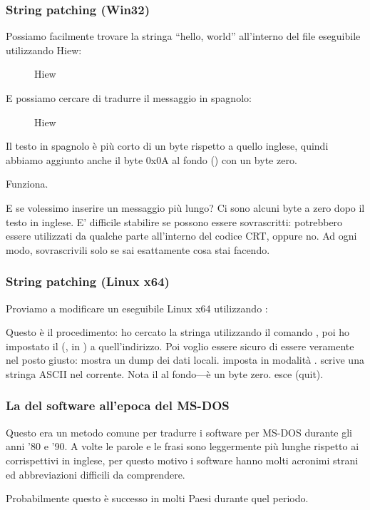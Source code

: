 \subsubsection{String patching (Win32)}

Possiamo facilmente trovare la stringa ``hello, world'' all'interno del file eseguibile utilizzando Hiew:

\begin{figure}[H]
\centering
{}
\caption{Hiew}
\label{}
\end{figure}

E possiamo cercare di tradurre il messaggio in spagnolo:

\begin{figure}[H]
\centering
{}
\caption{Hiew}
\label{}
\end{figure}

Il testo in spagnolo è più corto di un byte rispetto a quello inglese, quindi abbiamo aggiunto anche il byte 0x0A al fondo () con un byte zero.

Funziona.

E se volessimo inserire un messaggio più lungo?
Ci sono alcuni byte a zero dopo il testo in inglese.
E' difficile stabilire se possono essere sovrascritti: potrebbero essere utilizzati da qualche parte all'interno del codice \ac{CRT}, oppure no.
Ad ogni modo, sovrascrivili solo se sai esattamente cosa stai facendo.

\subsubsection{String patching (Linux x64)}

\myindex{\radare}
Proviamo a modificare un eseguibile Linux x64 utilizzando \radare{}:



Questo è il procedimento: ho cercato la stringa  utilizzando il comando \TT{/},
poi ho impostato il  (, in \radare{}) a quell'indirizzo.
Poi voglio essere sicuro di essere veramente nel posto giusto:  mostra un dump dei dati locali.
 imposta \radare{} in modalità .
 scrive una stringa ASCII nel  corrente.
Nota il  al fondo---è un byte zero.
 esce (quit).

\subsubsection{La  del software all'epoca del MS-DOS}

Questo era un metodo comune per tradurre i software per MS-DOS durante gli anni '80 e '90.
A volte le parole e le frasi sono leggermente più lunghe rispetto ai corrispettivi in inglese, per questo motivo i software 
hanno molti acronimi strani ed abbreviazioni difficili da comprendere.

Probabilmente questo è successo in molti Paesi durante quel periodo.
